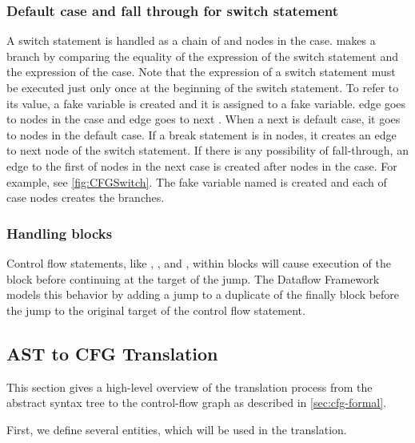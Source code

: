 \subsubsection{Default case and fall through for switch statement}
\label{sec:default-switch}
A switch statement is handled as a chain of  and nodes in
the case.  makes a branch by comparing the equality of
the expression of the switch statement and the expression of the case.
Note that the expression of a switch statement must be executed just only
once at the beginning of the switch statement. To refer to its value, a fake variable
is created and it is assigned to a fake variable. 
edge goes to nodes in the case and  edge goes to next
. When a next is default case, it goes to nodes in the default
case. If a break statement is in nodes, it creates an edge to next node of
the switch statement. If there is any possibility of fall-through, an edge
to the first of nodes in the next case is created after nodes in the case.
For example, see \autoref{fig:CFGSwitch}. The fake variable named 
is created and each of case nodes creates the branches.


\subsubsection{Handling  blocks}
\label{sec:try-finally}

Control flow statements, like , , and ,
within  blocks will cause execution of the  block before
continuing at the target of the jump. The Dataflow Framework models this
behavior by adding a jump to a duplicate of the finally block before the
jump to the original target of the control flow statement.


\subsection{AST to CFG Translation}
\label{sec:ast_to_cfg_translation}

This section gives a high-level overview of the translation process
from the abstract syntax tree to the control-flow graph as described
in \autoref{sec:cfg-formal}.

First, we define several entities, which will be used in the translation.

